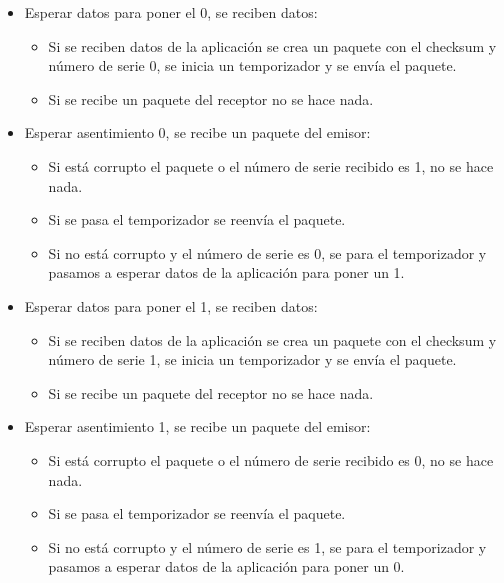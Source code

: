 \documentclass[12pt, twoside, openright]{report} %
\begin{document}
\begin{itemize}
	\item Esperar datos para poner el 0, se reciben datos:

	      \begin{itemize}
		      \item Si se reciben datos de la aplicación se crea un paquete con el
		            checksum y número de serie 0, se inicia un temporizador y se
		            envía el paquete.
		      \item Si se recibe un paquete del receptor no se hace nada.
	      \end{itemize}
	\item Esperar asentimiento 0, se recibe un paquete del emisor:

	      \begin{itemize}
		      \item Si está corrupto el paquete o el número de serie recibido es
		            1, no se hace nada.
		      \item Si se pasa el temporizador se reenvía el paquete.
		      \item Si no está corrupto y el número de serie es 0, se para el
		            temporizador y pasamos a esperar datos de la aplicación para
		            poner un 1.
	      \end{itemize}
	\item Esperar datos para poner el 1, se reciben datos:

	      \begin{itemize}
		      \item Si se reciben datos de la aplicación se crea un paquete con el
		            checksum y número de serie 1, se inicia un temporizador y se
		            envía el paquete.
		      \item Si se recibe un paquete del receptor no se hace nada.
	      \end{itemize}
	\item Esperar asentimiento 1, se recibe un paquete del emisor:

	      \begin{itemize}
		      \item Si está corrupto el paquete o el número de serie recibido es
		            0, no se hace nada.
		      \item Si se pasa el temporizador se reenvía el paquete.
		      \item Si no está corrupto y el número de serie es 1, se para el
		            temporizador y pasamos a esperar datos de la aplicación para
		            poner un 0.
	      \end{itemize}
\end{itemize}
\end{document}
